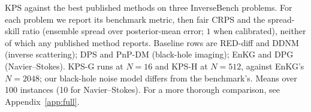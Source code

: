 \caption{KPS against the best published methods on three InverseBench problems. For each problem we report its benchmark metric, then fair CRPS and the spread-skill ratio (ensemble spread over posterior-mean error; $1$ when calibrated), neither of which any published method reports. Baseline rows are RED-diff and DDNM (inverse scattering); DPS and PnP-DM (black-hole imaging); EnKG and DPG (Navier--Stokes). KPS-G runs at $N{=}16$ and KPS-H at $N{=}512$, against EnKG's $N{=}2048$; our black-hole noise model differs from the benchmark's. Means over 100 instances (10 for Navier--Stokes). For a more thorough comparison, see Appendix~\ref{app:full}.}
